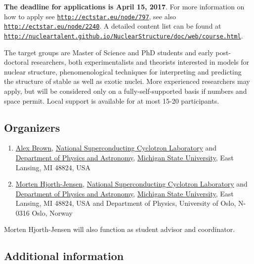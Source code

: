 \documentclass[%
oneside,                 %
final,                   %
10pt]{article}
\begin{document}
\textbf{The deadline for applications is April 15, 2017}.  
For more information on how  to apply see \href{{http://ectstar.eu/node/797}}{\nolinkurl{http://ectstar.eu/node/797}},
see also \href{{http://ectstar.eu/node/2240}}{\nolinkurl{http://ectstar.eu/node/2240}}. A detailed content list can be found at
\href{{http://nucleartalent.github.io/NuclearStructure/doc/web/course.html}}{\nolinkurl{http://nucleartalent.github.io/NuclearStructure/doc/web/course.html}}.

The target groups are Master of Science and PhD students and
early post-doctoral researchers, both experimentalists and
theorists interested in models for nuclear
structure, phenomenological techniques for interpreting and predicting
the structure of stable as well as exotic nuclei. More experienced researchers may apply, but will be
considered only on a fully-self-supported basis if numbers and space
permit. Local support is available for at most 15-20 participants.



\subsection*{Organizers}

\begin{enumerate}
\item \href{{https://people.nscl.msu.edu/~brown/}}{Alex Brown}, \href{{http://www.nscl.msu.edu/}}{National Superconducting Cyclotron Laboratory} and \href{{https://www.pa.msu.edu/}}{Department of Physics and Astronomy}, \href{{http://www.msu.edu/}}{Michigan State University}, East Lansing, MI 48824, USA

\item \href{{http://mhjgit.github.io/info/doc/web/}}{Morten Hjorth-Jensen}, \href{{http://www.nscl.msu.edu/}}{National Superconducting Cyclotron Laboratory} and \href{{https://www.pa.msu.edu/}}{Department of Physics and Astronomy}, \href{{http://www.msu.edu/}}{Michigan State University}, East Lansing, MI 48824, USA and Department of Physics, University of Oslo, N-0316 Oslo, Norway 
\end{enumerate}

\noindent
Morten Hjorth-Jensen will also function as student advisor and coordinator.

\subsection*{Additional information}
\end{document}
